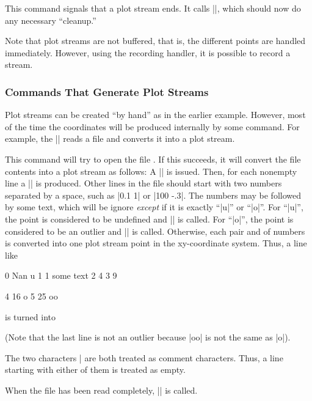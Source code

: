 \begin{command}{\pgfplotstreamend}
  This command signals that a plot stream ends. It calls
  |\pgf@plotstreamend|, which should now do any necessary ``cleanup.'' 
\end{command}

Note that plot streams are not buffered, that is, the different points
are handled immediately. However, using the recording handler, it is
possible to record a stream.


\subsubsection{Commands That Generate Plot Streams}
\label{section-plot-jumps}

Plot streams can be created ``by hand'' as in the earlier
example. However, most of the time the coordinates will be produced
internally by some command. For example, the |\pgfplotxyfile| reads a
file and converts it into a plot stream.

\begin{command}{\pgfplotxyfile{}}
  This command will try to open the file . If this
  succeeds, it will convert the file contents into a plot stream as
  follows: A |\pgfplotstreamstart| is issued. Then, for each nonempty
  line a |\pgfplotstreamnewdataset| is produced. Other lines in the
  file should start with two numbers separated by a space, such as
  |0.1 1| or |100 -.3|. The numbers may be followed by some text,
  which will be ignore \emph{except} if it is exactly ``|u|'' or
  ``|o|''. For ``|u|'', the point is considered to be undefined and
  |\pgfplotstreampointundefined| is called. For ``|o|'', the point is
  considered to be an outlier and |\pgfplotstreampointoutlier| is
  called. Otherwise, each pair  and  of numbers is
  converted into one  plot stream point in the xy-coordinate
  system. Thus, a line like 
\begin{codeexample}[code only, tikz syntax=false]
0 Nan u  
1 1 some text
2 4
3 9

4 16 o
5 25 oo
\end{codeexample}
  is turned into
\begin{codeexample}
\pgfplotstreamstart
\pgfplotstreampointundefined
{}
\pgfplotstreamnewdataset
{}
\pgfplotstreamend
\end{codeexample}
  (Note that the last line is not an outlier because |oo| is not the
  same as |o|).

  The two characters |%
  are both treated as comment characters. Thus, a line starting with
  either of them is treated as empty.

  When the file has been read completely, |\pgfplotstreamend| is
  called.
\end{command}



